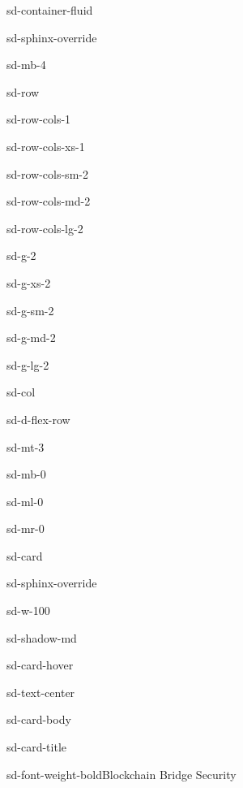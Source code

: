 \documentclass[letterpaper,10pt,english]{jupyterBook}
\begin{document}
\begin{sphinxuseclass}{sd-container-fluid}
\begin{sphinxuseclass}{sd-sphinx-override}
\begin{sphinxuseclass}{sd-mb-4}
\begin{sphinxuseclass}{sd-row}
\begin{sphinxuseclass}{sd-row-cols-1}
\begin{sphinxuseclass}{sd-row-cols-xs-1}
\begin{sphinxuseclass}{sd-row-cols-sm-2}
\begin{sphinxuseclass}{sd-row-cols-md-2}
\begin{sphinxuseclass}{sd-row-cols-lg-2}
\begin{sphinxuseclass}{sd-g-2}
\begin{sphinxuseclass}{sd-g-xs-2}
\begin{sphinxuseclass}{sd-g-sm-2}
\begin{sphinxuseclass}{sd-g-md-2}
\begin{sphinxuseclass}{sd-g-lg-2}
\begin{sphinxuseclass}{sd-col}
\begin{sphinxuseclass}{sd-d-flex-row}
\begin{sphinxuseclass}{sd-mt-3}
\begin{sphinxuseclass}{sd-mb-0}
\begin{sphinxuseclass}{sd-ml-0}
\begin{sphinxuseclass}{sd-mr-0}
\begin{sphinxuseclass}{sd-card}
\begin{sphinxuseclass}{sd-sphinx-override}
\begin{sphinxuseclass}{sd-w-100}
\begin{sphinxuseclass}{sd-shadow-md}
\begin{sphinxuseclass}{sd-card-hover}
\begin{sphinxuseclass}{sd-text-center}
\begin{sphinxuseclass}{sd-card-body}
\begin{sphinxuseclass}{sd-card-title}
\begin{sphinxuseclass}{sd-font-weight-bold}Blockchain Bridge Security
\end{sphinxuseclass}
\end{sphinxuseclass}




\end{sphinxuseclass}
\end{sphinxuseclass}
\end{sphinxuseclass}
\end{sphinxuseclass}
\end{sphinxuseclass}
\end{sphinxuseclass}
\end{sphinxuseclass}
\end{sphinxuseclass}
\end{sphinxuseclass}
\end{sphinxuseclass}
\end{sphinxuseclass}
\end{sphinxuseclass}
\end{sphinxuseclass}
\end{sphinxuseclass}
\end{sphinxuseclass}
\end{sphinxuseclass}
\end{sphinxuseclass}
\end{sphinxuseclass}
\end{sphinxuseclass}
\end{sphinxuseclass}
\end{sphinxuseclass}
\end{sphinxuseclass}
\end{sphinxuseclass}
\end{sphinxuseclass}
\end{sphinxuseclass}
\end{sphinxuseclass}
\end{sphinxuseclass}
\sphinxstepscope
\end{document}
